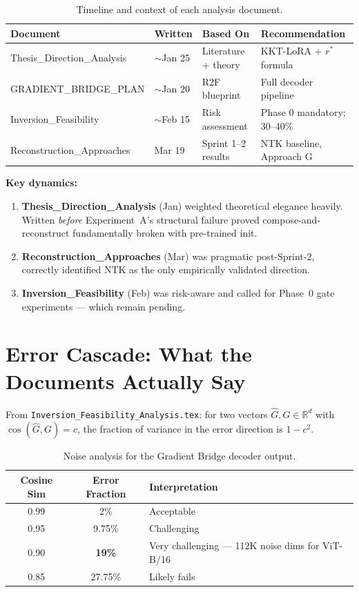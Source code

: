 \documentclass[11pt,a4paper]{article}
\begin{document}
\begin{table}[H]
\centering
\caption{Timeline and context of each analysis document.}
\label{tab:timeline}
\begin{tabularx}{\textwidth}{lllX}
\toprule
\textbf{Document} & \textbf{Written} & \textbf{Based On} & \textbf{Recommendation} \\
\midrule
Thesis\_Direction\_Analysis & $\sim$Jan 25 & Literature + theory & KKT-LoRA + $r^*$ formula \\
GRADIENT\_BRIDGE\_PLAN      & $\sim$Jan 20 & R2F blueprint & Full decoder pipeline \\
Inversion\_Feasibility      & $\sim$Feb 15 & Risk assessment & Phase 0 mandatory; 30--40\% \\
Reconstruction\_Approaches  & Mar 19       & Sprint 1--2 results & NTK baseline, Approach G \\
\bottomrule
\end{tabularx}
\end{table}

\textbf{Key dynamics:}
\begin{enumerate}[nosep]
    \item \textbf{Thesis\_Direction\_Analysis} (Jan) weighted theoretical elegance heavily. Written \emph{before} Experiment~A's structural failure proved compose-and-reconstruct fundamentally broken with pre-trained init.
    \item \textbf{Reconstruction\_Approaches} (Mar) was pragmatic post-Sprint-2, correctly identified NTK as the only empirically validated direction.
    \item \textbf{Inversion\_Feasibility} (Feb) was risk-aware and called for Phase~0 gate experiments --- which remain pending.
\end{enumerate}


\section{Error Cascade: What the Documents Actually Say}

From \texttt{Inversion\_Feasibility\_Analysis.tex}: for two vectors $\hat{G}, G \in \mathbb{R}^d$ with $\cos(\hat{G}, G) = c$, the fraction of variance in the error direction is $1 - c^2$.

\begin{table}[H]
\centering
\caption{Noise analysis for the Gradient Bridge decoder output.}
\label{tab:noise}
\begin{tabular}{ccp{6cm}}
\toprule
\textbf{Cosine Sim} & \textbf{Error Fraction} & \textbf{Interpretation} \\
\midrule
0.99 & 2\%     & Acceptable \\
0.95 & 9.75\%  & Challenging \\
0.90 & \textbf{19\%} & Very challenging --- 112K noise dims for ViT-B/16 \\
0.85 & 27.75\% & Likely fails \\
\bottomrule
\end{tabular}
\end{table}
\end{document}
